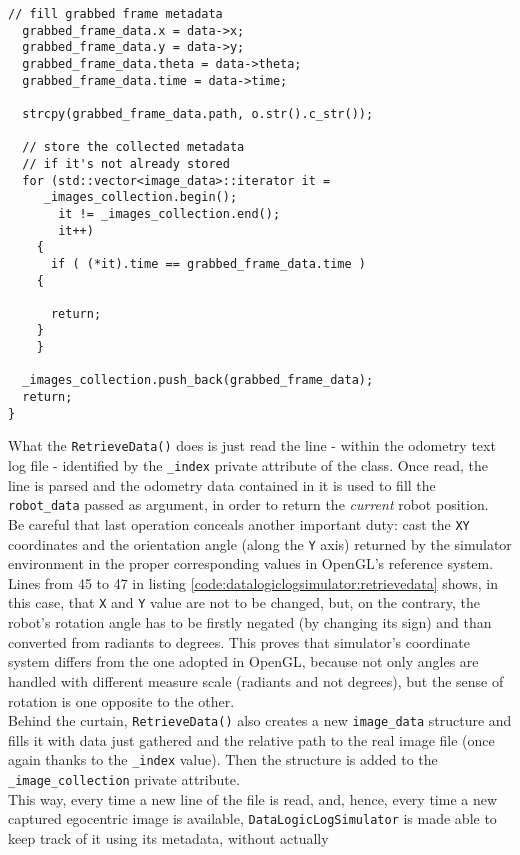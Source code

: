 \begin{lstlisting}[caption={\texttt{DataLogicLogSimulator::RetrieveData()} method},
    label={code:datalogiclogsimulator:retrievedata}]
  // fill grabbed frame metadata
  grabbed_frame_data.x = data->x;
  grabbed_frame_data.y = data->y;
  grabbed_frame_data.theta = data->theta;
  grabbed_frame_data.time = data->time;

  strcpy(grabbed_frame_data.path, o.str().c_str());

  // store the collected metadata 
  // if it's not already stored
  for (std::vector<image_data>::iterator it =
	 _images_collection.begin();
       it != _images_collection.end();
       it++)
    {
      if ( (*it).time == grabbed_frame_data.time )
	{

	  return;
	}
    }

  _images_collection.push_back(grabbed_frame_data);
  return;
}
\end{lstlisting}

What the \texttt{RetrieveData()} does is just read the line - within the odometry
text log file - identified by the \texttt{\_index} private attribute of the class.
Once read, the line is parsed and the odometry data contained 
in it is used to fill the \texttt{robot\_data} passed as argument, in 
order to return the \textit{current} robot position.
\\
Be careful that last operation conceals another important duty: cast the
\texttt{XY} coordinates and the orientation angle (along the \texttt{Y} axis) returned
by the simulator environment in the proper corresponding values in OpenGL's
reference system. Lines from 45 to 47 in listing
\ref{code:datalogiclogsimulator:retrievedata} shows, in this case,
that \texttt{X} and \texttt{Y} value are not to be changed, but,
on the contrary, the robot's
rotation angle has to be firstly negated (by changing its sign) and
than converted from radiants to degrees. This proves that simulator's coordinate
system differs from the one adopted in OpenGL, because not only angles
are handled with different measure scale (radiants and not degrees), but the
sense of rotation is one opposite to the other.
\\
Behind the curtain, \texttt{RetrieveData()} also creates a new 
\texttt{image\_data} structure and fills it with data just 
gathered and the relative path to the real image file (once again
thanks to the \texttt{\_index} value). Then the structure is added
to the \texttt{\_image\_collection} private attribute.
\\
This way, every time a new line of the file is read, and, hence, 
every time a new captured egocentric image is available, \texttt{DataLogicLogSimulator} 
is made able to keep track of it using its metadata, without actually 

